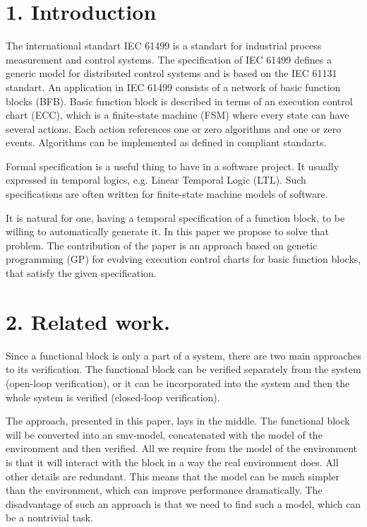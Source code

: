 \documentclass[fleqn,twocolumn]{article}
\begin{document}
\section{1. Introduction}

The international standart IEC 61499 is a standart for industrial process measurement and control systems.
The specification of IEC 61499 defines a generic model for distributed control systems and is based on the IEC 61131 standart.
An application in IEC 61499 consists of a network of basic function blocks (BFB). Basic function block is described in terms
of an execution control chart (ECC), which is a finite-state machine (FSM) where every state can have several actions.
Each action references one or zero algorithms and one or zero events. Algorithms can be implemented as defined in compliant standarts.

Formal specification is a useful thing to have in a software project. It usually expressed in temporal logics, e.g.
Linear Temporal Logic (LTL). Such specifications are often written for finite-state machine models of software.

It is natural for one, having a temporal specification of a function block, to be willing to automatically generate it.
In this paper we propose to solve that problem. The contribution of the paper is an approach based on genetic programming (GP)
for evolving execution control charts for basic function blocks, that satisfy the given specification.

\section{2. Related work.}

Since a functional block is only a part of a system, there are two main approaches to its verification.
The functional block can be verified separately from the system (open-loop verification), or it can be incorporated into the system and
then the whole system is verified (closed-loop verification).

The approach, presented in this paper, lays in the middle. The functional block will be converted into an smv-model, concatenated with the
model of the environment and then verified. All we require from the model of the environment is that it will interact with the block
in a way the real environment does. All other details are redundant. This means that the model can be much simpler than the environment,
which can improve performance dramatically. The disadvantage of such an approach is that we need to find such a model, which can be a nontrivial task.
\end{document}
